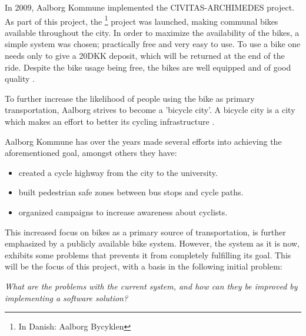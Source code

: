 In 2009, Aalborg Kommune implemented the CIVITAS-ARCHIMEDES project\cite{civitas-archimedes}.
As part of this project, the \citybike\footnote{In Danish: Aalborg Bycyklen} project was launched, making communal bikes available throughout the city\cite{aalborgbycyklenbagcyklen}.
In order to maximize the availability of the bikes, a simple system was chosen; practically free and very easy to use.
To use a bike one needs only to give a 20DKK deposit, which will be returned at the end of the ride.
Despite the bike usage being free, the bikes are well equipped and of good quality \cite{cykelplanlaegning}.

To further increase the likelihood of people using the bike as primary transportation, Aalborg strives to become a 'bicycle city'.
A bicycle city is a city which makes an effort to better its cycling infrastructure \cite{cykelhandlingsplan}.

Aalborg Kommune has over the years  made several efforts into achieving the aforementioned goal, amongst others they have:
\begin{itemize}
\item created a cycle highway from the city to the university\cite{cykelhandlingsplan}.
\item built pedestrian safe zones between bus stops and cycle paths\cite{pedestriansafezone}.
\item organized campaigns to increase awareness about cyclists\cite{cykelbycampaigns}.
\end{itemize}

This increased focus on bikes as a primary source of transportation, is further emphasized by a publicly available bike system.
However, the system as it is now, exhibits some problems that prevents it from completely fulfilling its goal.
This will be the focus of this project, with a basis in the following initial problem:

\begin{center}
\textit{What are the problems with the current \citybike system, and how can they be improved by implementing a software solution?}
\end{center}
